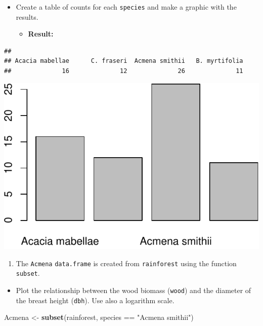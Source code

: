 \documentclass[]{article}
\def\tightlist{}
\newenvironment{Shaded}{\begin{snugshade}}{\end{snugshade}}
\newcommand{\KeywordTok}[1]{\textcolor[rgb]{0.13,0.29,0.53}{\textbf{{#1}}}}
\newcommand{\StringTok}[1]{\textcolor[rgb]{0.31,0.60,0.02}{{#1}}}
\newcommand{\NormalTok}[1]{{#1}}
\numberwithin{equation}{section}
\begin{document}
\begin{itemize}
\item
  Create a table of counts for each \texttt{species} and make a graphic
  with the results.

  \begin{itemize}
  \tightlist
  \item
    \textbf{Result:}
  \end{itemize}
\end{itemize}

\begin{verbatim}
## 
## Acacia mabellae      C. fraseri  Acmena smithii   B. myrtifolia 
##              16              12              26              11
\end{verbatim}

\includegraphics{index_files/figure-latex/unnamed-chunk-68-1.pdf}

\begin{enumerate}
\def\labelenumi{\arabic{enumi}.}
\setcounter{enumi}{2}
\tightlist
\item
  The \texttt{Acmena} \texttt{data.frame} is created from
  \texttt{rainforest} using the function \texttt{subset}.
\end{enumerate}

\begin{itemize}
\tightlist
\item
  Plot the relationship between the wood biomass (\texttt{wood}) and the
  diameter of the breast height (\texttt{dbh}). Use also a logarithm
  scale.
\end{itemize}

\begin{Shaded}
\begin{Highlighting}[]
\NormalTok{Acmena <-}\StringTok{ }\KeywordTok{subset}\NormalTok{(rainforest, species ==}\StringTok{ "Acmena smithii"}\NormalTok{)}
\end{Highlighting}
\end{Shaded}
\end{document}
